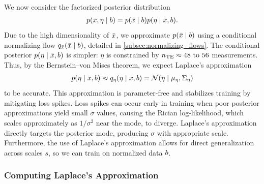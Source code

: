 We now consider the factorized posterior distribution
\begin{align}\label{eqn:posterior_factorization}
    p(\bar{x}, \eta \mid b) = p(\bar{x} \mid b)  p(\eta \mid \bar{x}, b).
\end{align}
Due to the high dimensionality of $\bar{x}$, we approximate $p(\bar{x} \mid b)$ using a conditional normalizing flow $q_{\bar{x}}(\bar{x} \mid b)$, detailed in \cref{subsec:normalizing_flows}.
The conditional posterior $p(\eta \mid \bar{x}, b)$ is simpler: $\eta$ is constrained by $n_{\TE} \approx \numrange{48}{56}$ measurements.
Thus, by the Bernstein--von Mises theorem, we expect Laplace's approximation
\begin{align}\label{eqn:laplace_approximation}
    p(\eta \mid \bar{x}, b) \approx q_{\eta}(\eta \mid \bar{x}, b) = \mathcal{N}(\eta \mid \mu_{\eta}, \Sigma_{\eta})
\end{align}
to be accurate.
This approximation is parameter-free and stabilizes training by mitigating loss spikes.
Loss spikes can occur early in training when poor posterior approximations yield small $\sigma$ values, causing the Rician log-likelihood, which scales approximately as $1/\sigma^2$ near the mode, to diverge.
Laplace's approximation directly targets the posterior mode, producing $\sigma$ with appropriate scale.
Furthermore, the use of Laplace's approximation allows for direct generalization across scales $s$, so we can train on normalized data $b$.

\subsubsection{Computing Laplace's Approximation}\label{subsubsec:laplace_approximation}

